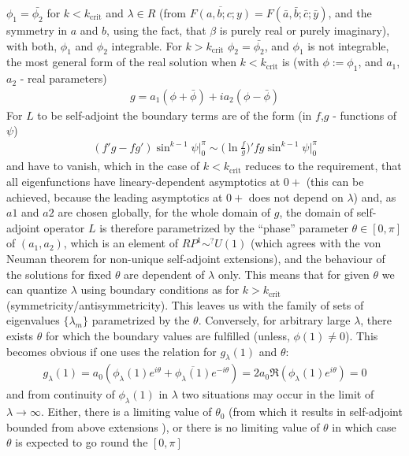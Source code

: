 \documentclass[
a4paper,%
10pt,%
titlepage,%
twoside%
]{article}
\begin{document}
$\phi_1=\bar{\phi_2}$ for $k<k_\text{crit}$ and $\lambda\in R$ (from
$\overline{F(a,b;c;y)}=F(\bar{a},\bar{b};\bar{c};\bar{y})$, and the
symmetry in $a$ and $b$, using the fact, that $\beta$ is purely real
or purely imaginary), with both, $\phi_1$ and $\phi_2$ integrable. For
$k>k_\text{crit}$ $\phi_2=\bar{\phi_2}$, and $\phi_1$ is not
integrable, the most general form of the real solution when
$k<k_\text{crit}$ is (with $\phi:=\phi_1$, and $a_1$, $a_2$ - real
parameters)
\begin{gather}
  g=a_1(\phi+\bar\phi)+i a_2(\phi-\bar\phi)
\end{gather}
For $L$ to be self-adjoint the boundary terms are of the form
(in $f$,$g$ - functions of $\psi$)
\begin{gather}
  (f'g-fg')\sin^{k-1}\psi\big|^\pi_0\sim \bigg(\ln \frac{f}{g}\bigg)'fg\sin^{k-1}\psi\big|_0^\pi
\end{gather}
and have to vanish, which in the case of $k<k_\text{crit}$ reduces to
the requirement, that all eigenfunctions have lineary-dependent
asymptotics at $0+$ (this can be achieved, because the leading
asymptotics at $0+$ does not depend on $\lambda$) and, as $a1$ and
$a2$ are chosen globally, for the whole domain of $g$, the domain of
self-adjoint operator $L$ is therefore parametrized by the ``phase''
parameter $\theta\in[0,\pi]$ of $(a_1,a_2)$, which is an element of
$RP^1\sim^?U(1)$ (which agrees with the von Neuman theorem for
non-unique self-adjoint extensions), and the behaviour of the solutions
for fixed $\theta$ are dependent of $\lambda$ only. This means that
for given $\theta$ we can quantize $\lambda$ using boundary conditions
as for $k>k_\text{crit}$ (symmetricity/antisymmetricity). This leaves
us with the family of sets of eigenvalues $\{\lambda_m\}$ parametrized
by the $\theta$. Conversely, for arbitrary large $\lambda$, there
exists $\theta$ for which the boundary values are fulfilled (unless,
$\phi(1)\ne0$). This becomes obvious if one uses the relation for
$g_\lambda(1)$ and $\theta$:
\begin{gather}
  g_\lambda(1)=a_0(\phi_\lambda(1)
  e^{i\theta}+\overline{\phi_\lambda(1)} e^{-i\theta})=2a_0\Re
  (\phi_\lambda(1) e^{i\theta})=0
\end{gather}
and from continuity of $\phi_\lambda(1)$ in $\lambda$ two situations
may occur in the limit of $\lambda\rightarrow\infty$. Either, there is
a limiting value of $\theta_0$ (from which it results in self-adjoint
bounded from above extensions ), or there is no limiting value of
$\theta$ in which case $\theta$ is expected to go round the $[0,\pi]$
\end{document}
